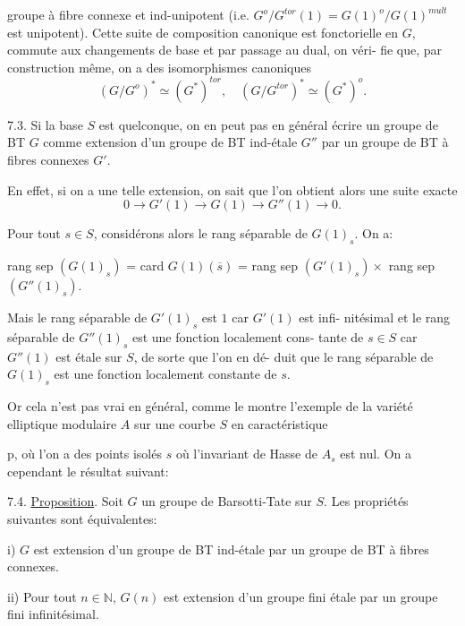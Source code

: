 \documentclass[11pt]{article}
\newcommand{\scanpage}[1]{\par\bigskip\noindent{\small\sffamily[scan #1]}\par}
\newcommand{\mspage}[1]{{\small\sffamily[p.\,#1]}}
\newcommand{\hand}[1]{\textcolor{blue}{#1}}
\newcommand{\uline}[1]{\underline{#1}}
\begin{document}
groupe à fibre connexe et ind-unipotent (i.e. $G^{o}/G^{tor}(1) = G(1)^{o}/G(1)^{mult}$
est unipotent). Cette suite de composition canonique est fonctorielle
en $G$, commute aux changements de base et par passage au dual, on véri-%
fie que, par construction même, on a des isomorphismes canoniques
\[ (G/G^{o})^{*} \simeq (G^{*})^{tor} , \quad (G/G^{tor})^{*} \simeq (G^{*})^{o} . \]

7.3. Si la base $S$ est quelconque, on en peut pas en général écrire
un groupe de BT $G$ comme extension d'un groupe de BT ind-étale $G''$
par un groupe de BT à fibres connexes $G'$.

En effet, si on a une telle extension, on sait que l'on obtient
alors une suite exacte
\[ 0 \to G'(1) \to G(1) \to G''(1) \to 0 . \]

Pour tout $s \in S$, considérons alors le rang séparable de
$G(1)_{s}$. On a:

rang sep $(G(1)_{s})$ = card $G(1)(\overline{s})$ = rang sep $(G'(1)_{s}) \times$ rang sep $(G''(1)_{s})$.

Mais le rang séparable de $G'(1)_{s}$ est $1$ car $G'(1)$ est infi-%
nitésimal et le rang séparable de $G''(1)_{s}$ est une fonction localement cons-%
tante de $s \in S$ car $G''(1)$ est étale sur $S$, de sorte que l'on en dé-%
duit que le rang séparable de $G(1)_{s}$ est une fonction localement constante
de $s$.

Or cela n'est pas vrai en général, comme le montre l'exemple de
la variété elliptique modulaire $A$ sur une courbe $S$ en caractéristique

\mspage{\hand{74}}

\clearpage
\scanpage{129/75}
\mspage{\hand{III-20}}

p, où l'on a des points isolés $s$ où l'invariant de Hasse de $A_s$ est
nul. On a cependant le résultat suivant:

7.4. \uline{Proposition}. Soit $G$ un groupe de Barsotti-Tate sur $S$. Les
propriétés suivantes sont équivalentes:

i) $G$ est extension d'un groupe de BT ind-étale par un groupe
de BT à fibres connexes.

ii) Pour tout $n \in \mathbb{N}$, $G(n)$ est extension d'un groupe fini
étale par un groupe fini infinitésimal.
\end{document}
